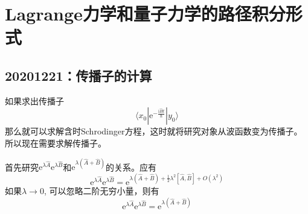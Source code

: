 \chapter{Lagrange力学和量子力学的路径积分形式}
    \section{20201221：传播子的计算}
        如果求出传播子
        \begin{equation*}
            \langle x_0 | \mathrm{e}^{-\frac {\mathrm{i}\hat{H}t}{\hbar}} | y_0 \rangle
        \end{equation*}
        那么就可以求解含时Schrodinger方程，这时就将研究对象从波函数变为传播子。所以现在需要求解传播子。

        首先研究$\mathrm{e}^{\lambda \hat{A}}\mathrm{e}^{\lambda \hat{B}}$和$\mathrm{e}^{\lambda (\hat{A}+\hat{B})}$的关系。应有
        \begin{equation*}
            \mathrm{e}^{\lambda \hat{A}} \mathrm{e}^{\lambda \hat{B}} = \mathrm{e}^{\lambda (\hat{A}+\hat{B}) + \frac 12 \lambda^2 [\hat{A},\hat{B}] + O(\lambda^2)}
        \end{equation*}
        如果$\lambda \to 0$, 可以忽略二阶无穷小量，则有
        \begin{equation*}
            \mathrm{e}^{\lambda \hat{A}} \mathrm{e}^{\lambda \hat{B}} = \mathrm{e}^{\lambda (\hat{A}+\hat{B})}
        \end{equation*}


